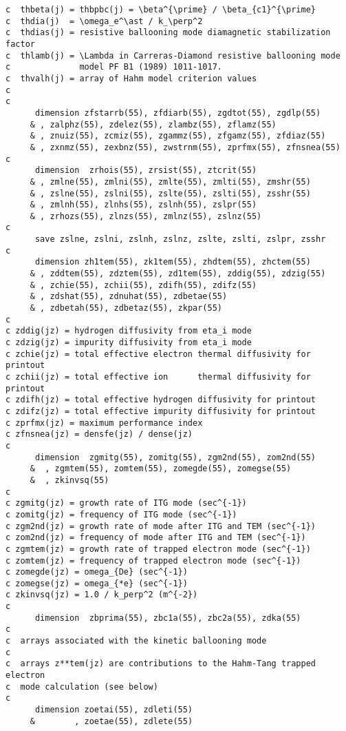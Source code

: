 \begin{verbatim}
c  thbeta(j) = thbpbc(j) = \beta^{\prime} / \beta_{c1}^{\prime}
c  thdia(j)  = \omega_e^\ast / k_\perp^2
c  thdias(j) = resistive ballooning mode diamagnetic stabilization factor
c  thlamb(j) = \Lambda in Carreras-Diamond resistive ballooning mode
c              model PF B1 (1989) 1011-1017.
c  thvalh(j) = array of Hahm model criterion values
c
c
      dimension zfstarrb(55), zfdiarb(55), zgdtot(55), zgdlp(55)
     & , zalphz(55), zdelez(55), zlambz(55), zflamz(55)
     & , znuiz(55), zcmiz(55), zgammz(55), zfgamz(55), zfdiaz(55)
     & , zxnmz(55), zexbnz(55), zwstrnm(55), zprfmx(55), zfnsnea(55)
c
      dimension  zrhois(55), zrsist(55), ztcrit(55)
     & , zmlne(55), zmlni(55), zmlte(55), zmlti(55), zmshr(55)
     & , zslne(55), zslni(55), zslte(55), zslti(55), zsshr(55)
     & , zmlnh(55), zlnhs(55), zslnh(55), zslpr(55)
     & , zrhozs(55), zlnzs(55), zmlnz(55), zslnz(55)
c
      save zslne, zslni, zslnh, zslnz, zslte, zslti, zslpr, zsshr
c
      dimension zh1tem(55), zk1tem(55), zhdtem(55), zhctem(55)
     & , zddtem(55), zdztem(55), zd1tem(55), zddig(55), zdzig(55)
     & , zchie(55), zchii(55), zdifh(55), zdifz(55)
     & , zdshat(55), zdnuhat(55), zdbetae(55)
     & , zdbetah(55), zdbetaz(55), zkpar(55)
c
c zddig(jz) = hydrogen diffusivity from eta_i mode
c zdzig(jz) = impurity diffusivity from eta_i mode
c zchie(jz) = total effective electron thermal diffusivity for printout
c zchii(jz) = total effective ion      thermal diffusivity for printout
c zdifh(jz) = total effective hydrogen diffusivity for printout
c zdifz(jz) = total effective impurity diffusivity for printout
c zprfmx(jz) = maximum performance index
c zfnsnea(jz) = densfe(jz) / dense(jz)
c
      dimension  zgmitg(55), zomitg(55), zgm2nd(55), zom2nd(55)
     &  , zgmtem(55), zomtem(55), zomegde(55), zomegse(55)
     &  , zkinvsq(55)
c
c zgmitg(jz) = growth rate of ITG mode (sec^{-1})
c zomitg(jz) = frequency of ITG mode (sec^{-1})
c zgm2nd(jz) = growth rate of mode after ITG and TEM (sec^{-1})
c zom2nd(jz) = frequency of mode after ITG and TEM (sec^{-1})
c zgmtem(jz) = growth rate of trapped electron mode (sec^{-1})
c zomtem(jz) = frequency of trapped electron mode (sec^{-1})
c zomegde(jz) = omega_{De} (sec^{-1})
c zomegse(jz) = omega_{*e} (sec^{-1})
c zkinvsq(jz) = 1.0 / k_perp^2 (m^{-2})
c
      dimension  zbprima(55), zbc1a(55), zbc2a(55), zdka(55)
c
c  arrays associated with the kinetic ballooning mode
c
c  arrays z**tem(jz) are contributions to the Hahm-Tang trapped electron
c  mode calculation (see below)
c
      dimension zoetai(55), zdleti(55)
     &        , zoetae(55), zdlete(55)

\end{verbatim}
